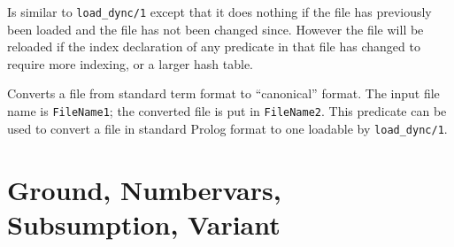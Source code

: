\begin{description}
    Is similar to {\tt load\_dync/1} except that it does nothing if the
    file has previously been loaded and the file has not been changed
    since.  However the file will be reloaded if the index declaration of
    any predicate in that file has changed to require more indexing, or a
    larger hash table.

    Converts a file from standard term format to ``canonical'' format.
    The input file name is {\tt FileName1}; the converted file is put in
    {\tt FileName2}.  This predicate can be used to convert a file in
    standard Prolog format to one loadable by {\tt load\_dync/1}.
\end{description}



\section{Ground, Numbervars, Subsumption, Variant} \label{NumberVars}

